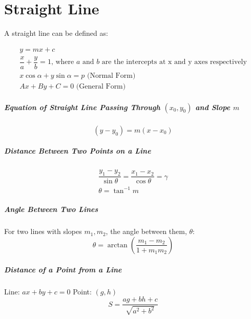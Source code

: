 \documentclass[openany, oneside]{book}
\begin{document}

\large{\chapter{Straight Line}}
A straight line can be defined as:

\begin{align}
y=mx+c\\
\dfrac{x}{a}+\dfrac{y}{b}=1\text{, where }a\text{ and }b\text{ are the intercepts at x and y axes respectively}\\
x\cos\alpha + y\sin\alpha = p\text{ (Normal Form)}\\
Ax+By+C=0\text{ (General Form)}
\end{align}

\paragraph{Equation of Straight Line Passing Through $(x_0,y_0)$ and Slope $m$\newline}
\begin{equation}
(y-y_0)=m(x-x_0)
\end{equation}

\paragraph{Distance Between Two Points on a Line\newline}
\begin{align}
\dfrac{y_1-y_2}{\sin\theta}=\dfrac{x_1-x_2}{\cos\theta}=\gamma\\
\theta=\tan^{-1}m
\end{align}

\paragraph{Angle Between Two Lines\newline}
For two lines with slopes $m_1, m_2$, the angle between them, $\theta$:
\begin{equation}
\theta=\arctan\left(\dfrac{m_1-m_2}{1+m_1m_2}\right)
\end{equation}

\paragraph{Distance of a Point from a Line\newline}
Line: $ax+by+c=0$
Point: $(g,h)$
\begin{equation}
S=\dfrac{ag+bh+c}{\sqrt{a^2+b^2}}
\end{equation}
\end{document}
